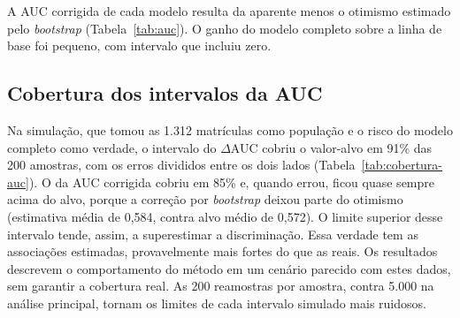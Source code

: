 \documentclass[12pt,a4paper]{article}
\newcommand{\tabela}[1]{\sbox\caixatabela{}%
  \ifdim\wd\caixatabela>\linewidth \resizebox{\linewidth}{!}{\usebox\caixatabela}%
  \else\ifdim\dimexpr\ht\caixatabela+\dp\caixatabela\relax>0.80\textheight
    \resizebox*{!}{0.80\textheight}{\usebox\caixatabela}%
  \else\usebox\caixatabela\fi\fi}
\begin{document}
A AUC corrigida de cada modelo resulta da aparente menos o otimismo estimado pelo \textit{bootstrap} (Tabela~\ref{tab:auc}). O ganho do modelo completo sobre a linha de base foi pequeno, com intervalo que incluiu zero.

\begin{table}[H]
  \centering
  \caption[AUC aparente e corrigida e ganho em relação à linha de base]{Área sob a curva ROC (AUC) aparente e corrigida por otimismo, com o ganho
  em relação à linha de base ($\Delta$AUC), com IC 95\% por \textit{bootstrap}
  (5.000 reamostras, as mesmas para todos os modelos). Cada linha intermediária é
  a linha de base acrescida de um único bloco. Em uma simulação, os intervalos da AUC corrigida e do $\Delta$AUC cobriram o valor-alvo em 85\% e 91\% das amostras. O da AUC corrigida, quando errou, quase sempre ficou acima dele (Apêndice~\ref{apendice:comparacao}). O acréscimo do modelo
  completo foi testado pelo Wald conjunto (p = 0,12).}
  \label{tab:auc}
  \tabela{tab_art_auc.tex}
\end{table}

\subsection*{Cobertura dos intervalos da AUC}

Na simulação, que tomou as 1.312 matrículas como população e o risco do modelo completo como verdade, o intervalo do $\Delta$AUC cobriu o valor-alvo em 91\% das 200 amostras, com os erros divididos entre os dois lados (Tabela~\ref{tab:cobertura-auc}). O da AUC corrigida cobriu em 85\% e, quando errou, ficou quase sempre acima do alvo, porque a correção por \textit{bootstrap} deixou parte do otimismo (estimativa média de 0,584, contra alvo médio de 0,572). O limite superior desse intervalo tende, assim, a superestimar a discriminação. Essa verdade tem as associações estimadas, provavelmente mais fortes do que as reais. Os resultados descrevem o comportamento do método em um cenário parecido com estes dados, sem garantir a cobertura real. As 200 reamostras por amostra, contra 5.000 na análise principal, tornam os limites de cada intervalo simulado mais ruidosos.

\begin{table}[H]
  \centering
  \caption[Cobertura dos intervalos de 95\% da AUC corrigida e do $\Delta$AUC]{Cobertura dos intervalos de 95\% da AUC corrigida e do $\Delta$AUC em uma simulação com 200 amostras e 200 reamostras cada. EP é o erro-padrão de Monte Carlo da cobertura e o alvo, a AUC do modelo ajustado na amostra avaliada na população.}
  \label{tab:cobertura-auc}
  \tabela{tab_tcc_cobertura_auc.tex}
\end{table}
\end{document}
